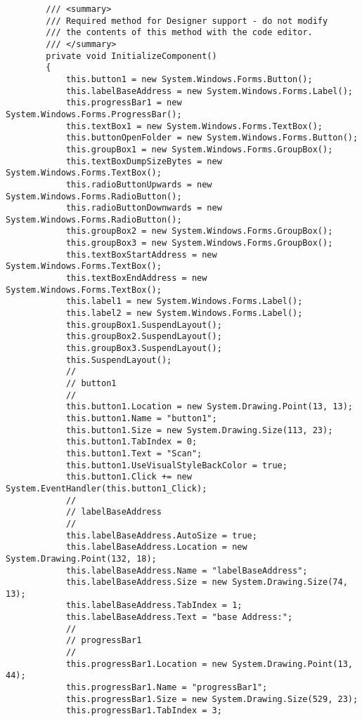 \begin{lstlisting}
        /// <summary>
        /// Required method for Designer support - do not modify
        /// the contents of this method with the code editor.
        /// </summary>
        private void InitializeComponent()
        {
            this.button1 = new System.Windows.Forms.Button();
            this.labelBaseAddress = new System.Windows.Forms.Label();
            this.progressBar1 = new System.Windows.Forms.ProgressBar();
            this.textBox1 = new System.Windows.Forms.TextBox();
            this.buttonOpenFolder = new System.Windows.Forms.Button();
            this.groupBox1 = new System.Windows.Forms.GroupBox();
            this.textBoxDumpSizeBytes = new System.Windows.Forms.TextBox();
            this.radioButtonUpwards = new System.Windows.Forms.RadioButton();
            this.radioButtonDownwards = new System.Windows.Forms.RadioButton();
            this.groupBox2 = new System.Windows.Forms.GroupBox();
            this.groupBox3 = new System.Windows.Forms.GroupBox();
            this.textBoxStartAddress = new System.Windows.Forms.TextBox();
            this.textBoxEndAddress = new System.Windows.Forms.TextBox();
            this.label1 = new System.Windows.Forms.Label();
            this.label2 = new System.Windows.Forms.Label();
            this.groupBox1.SuspendLayout();
            this.groupBox2.SuspendLayout();
            this.groupBox3.SuspendLayout();
            this.SuspendLayout();
            // 
            // button1
            // 
            this.button1.Location = new System.Drawing.Point(13, 13);
            this.button1.Name = "button1";
            this.button1.Size = new System.Drawing.Size(113, 23);
            this.button1.TabIndex = 0;
            this.button1.Text = "Scan";
            this.button1.UseVisualStyleBackColor = true;
            this.button1.Click += new System.EventHandler(this.button1_Click);
            // 
            // labelBaseAddress
            // 
            this.labelBaseAddress.AutoSize = true;
            this.labelBaseAddress.Location = new System.Drawing.Point(132, 18);
            this.labelBaseAddress.Name = "labelBaseAddress";
            this.labelBaseAddress.Size = new System.Drawing.Size(74, 13);
            this.labelBaseAddress.TabIndex = 1;
            this.labelBaseAddress.Text = "base Address:";
            // 
            // progressBar1
            // 
            this.progressBar1.Location = new System.Drawing.Point(13, 44);
            this.progressBar1.Name = "progressBar1";
            this.progressBar1.Size = new System.Drawing.Size(529, 23);
            this.progressBar1.TabIndex = 3;

\end{lstlisting}
